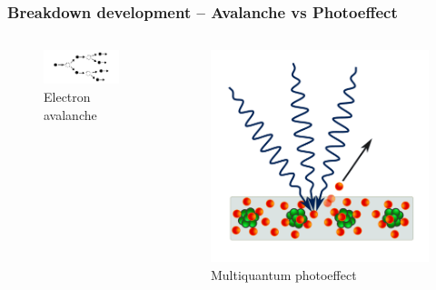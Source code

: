 \documentclass{beamer}
\begin{document}
	
	\begin{frame}
		\frametitle{Breakdown development -- Avalanche vs Photoeffect}
		
		\begin{columns}
			\begin{figure}
				\centering
				\includegraphics[width=0.9\linewidth]{res/electron_avalanche.png}
				\caption*{Electron avalanche}
			\end{figure}
			
			\begin{figure}
				\centering
				\includegraphics[width=0.9\linewidth]{res/multiphoton.png}
				\caption*{Multiquantum photoeffect}
			\end{figure}
		\end{columns}
		

\end{frame}
\end{document}
